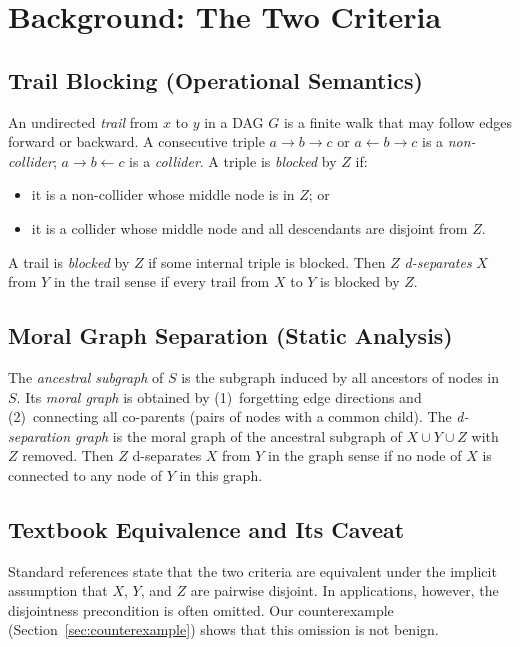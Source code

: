 \documentclass[acmsmall,screen,nonacm]{acmart}
\begin{document}
\section{Background: The Two Criteria}\label{sec:background}

\subsection{Trail Blocking (Operational Semantics)}

An undirected \emph{trail} from $x$ to $y$ in a DAG $G$ is a finite walk that may
follow edges forward or backward.  A consecutive triple $a \to b \to c$ or
$a \leftarrow b \to c$ is a \emph{non-collider}; $a \to b \leftarrow c$ is a
\emph{collider}.  A triple is \emph{blocked} by $Z$ if:
\begin{itemize}
  \item it is a non-collider whose middle node is in $Z$; or
  \item it is a collider whose middle node and all descendants are disjoint from $Z$.
\end{itemize}
A trail is \emph{blocked} by $Z$ if some internal triple is blocked.  Then $Z$
\emph{d-separates} $X$ from $Y$ in the trail sense if every trail from $X$ to $Y$
is blocked by $Z$.

\subsection{Moral Graph Separation (Static Analysis)}

The \emph{ancestral subgraph} of $S$ is the subgraph induced by all ancestors of
nodes in $S$.  Its \emph{moral graph} is obtained by (1)~forgetting edge
directions and (2)~connecting all co-parents (pairs of nodes with a common child).
The \emph{d-separation graph} is the moral graph of the ancestral subgraph of
$X \cup Y \cup Z$ with $Z$ removed.  Then $Z$ d-separates $X$ from $Y$ in the
graph sense if no node of $X$ is connected to any node of $Y$ in this graph.

\subsection{Textbook Equivalence and Its Caveat}

Standard references state that the two criteria are equivalent under the implicit
assumption that $X$, $Y$, and $Z$ are pairwise disjoint.  In applications,
however, the disjointness precondition is often omitted.  Our counterexample
(Section~\ref{sec:counterexample}) shows that this omission is not benign.
\end{document}
